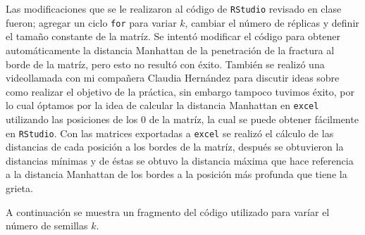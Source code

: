 \documentclass{article}
\begin{document}
Las modificaciones que se le realizaron al código de \texttt{RStudio} revisado en clase fueron; agregar un ciclo \texttt{for} para variar $k$, cambiar el número de réplicas y definir el tamaño constante de la matríz. Se intentó modificar el código para obtener automáticamente la distancia Manhattan de la penetración de la fractura al borde de la matríz, pero esto no resultó con éxito. También se realizó una videollamada con mi compañera Claudia Hernández para discutir ideas sobre como realizar el objetivo de la práctica, sin embargo tampoco tuvimos éxito, por lo cual óptamos por la idea de calcular la distancia Manhattan en \texttt{excel} utilizando las posiciones de los $0$ de la matríz, la cual se puede obtener fácilmente en \texttt{RStudio}. Con las matrices exportadas a \texttt{excel} se realizó el cálculo de las distancias de cada posición a los bordes de la matríz, después se obtuvieron la distancias mínimas y de éstas se obtuvo la distancia máxima que hace referencia a la distancia Manhattan de los bordes a la posición más profunda que tiene la grieta. 

A continuación se muestra un fragmento del código utilizado para varíar el número de semillas $k$.

\end{document}
